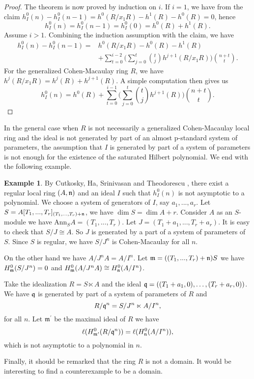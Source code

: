 \documentclass{amsart}
\theoremstyle {definition}
\newtheorem {example}[theorem]{Example}
\theoremstyle {remark}
\begin{document}
\begin{proof}
The theorem is now proved by induction on $i$. If $i=1$, we have from the claim $h_I^0(n)-h_I^0(n-1)=h^0(R/x_1R)-h^1(R)-h^0(R)=0$, hence
$$h_I^0(n)=h^0_I(n-1)=h^0_I(0)=h^0(R)+h^1(R).$$
Assume $i>1$. Combining the induction assumption with the claim, we have
\[\begin{aligned}
h_I^0(n)-h_I^0(n-1)=&h^0(R/x_1R)-h^0(R)-h^1(R)\\
&+\sum_{t=0}^{i-2}\Big(\sum_{j=0}^t\binom{t}jh^{j+1}(R/x_1R)\Big)\binom{n+t}{t}.\end{aligned}\]
For the generalized Cohen-Macaulay ring $R$, we have $h^j(R/x_1R)=h^j(R)+h^{j+1}(R)$. A simple computation then gives us
$$h_I^0(n)=h^0(R)+\sum_{t=0}^{i-1}\Big(\sum_{j=0}^t\binom{t}jh^{j+1}(R)\Big)\binom{n+t}{t}.$$
\end{proof}

In the general case when $R$ is not necessarily a generalized Cohen-Macaulay local ring and the ideal is not generated by part of an almost p-standard system of parameters, the assumption that $I$ is generated by part of a system of parameters is not enough for the existence of the saturated Hilbert polynomial. We end with the following example.

\begin{example}\label{310}
By Cutkosky, Ha, Srinivasan and Theodorescu \cite[Theorem 2.2]{CTST}, there exist a regular local ring $(A,\frak n)$ and an ideal $I$ such that $h^0_I(n)$ is not asymptotic to a polynomial. We choose a system of generators of $I$, say $a_1, ..., a_r$. Let $S = A[T_1, ..., T_r]_{(T_1,..., T_r)+\frak n}$, we have $\dim S = \dim A + r$. Consider $A$ as an $S$-module we have $\mathrm{Ann}_SA = (T_1, ..., T_r)$. Let $J = (T_1+a_1, ..., T_r+a_r)$. It is easy to check that $S/J \cong A$. So $J$ is generated by a part of a system of parameters of $S$. Since $S$ is regular, we have  $S/J^n$ is Cohen-Macaulay for all $n$.

On the other hand we have $A/J^nA = A/I^n$. Let $\frak m = ((T_1,..., T_r)+\frak n)S$ we have $H^0_{\frak m}(S/J^n) = 0$ and $H^0_{\frak m}(A/J^nA) \cong H^0_{\frak n}(A/I^n)$.

Take the idealization $R = S \ltimes A$ and the ideal $\frak q = ((T_1+a_1, 0), \ldots, (T_r+a_r, 0))$. We have $\frak q$ is generated by part of a system of parameters of $R$ and
$$R/\frak q^n = S/J^n \ltimes A/I^n,$$
for all $n$. Let ${\ensuremath{\mathfrak m}}^\prime$ be the maximal ideal of $R$ we have
$$\ell(H^0_{{\ensuremath{\mathfrak m}}^\prime}(R/\frak q^n)) = \ell(H^0_{\frak n}(A/I^n)),$$
which is not asymptotic to a polynomial in $n$.

Finally, it should be remarked that the ring $R$ is not a domain. It would be interesting to find a counterexample to be a domain.
\end{example}
\end{document}
